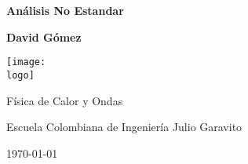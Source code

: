 \documentclass{article}
\newcommand{\logo}{"logo-eci.png"}
\newcommand{\titlename}{Análisis No Estandar}
\renewcommand{\author}{{David Gómez}}
\begin{document}
\begin{titlepage}
    \begin{center}
        \vspace{1cm}

        \textbf{\Huge{\titlename}}

        \vspace{1.5cm}

        \textbf{\large{\author}}

        \vspace{3cm}

        \texttt{[image: \\logo]}
        
        \vfill

        Física de Calor y Ondas

        Escuela Colombiana de Ingeniería Julio Garavito

        \today
    \end{center}
\end{titlepage}

\clearpage
\tableofcontents


\end{document}
